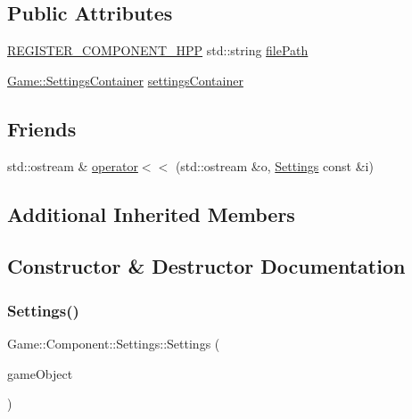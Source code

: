 \subsection*{Public Attributes}
\begin{DoxyCompactItemize}
\item 
\mbox{\hyperlink{_core_8hpp_a895cfc16b36b6c309f80b98ded63df4f}{R\+E\+G\+I\+S\+T\+E\+R\+\_\+\+C\+O\+M\+P\+O\+N\+E\+N\+T\+\_\+\+H\+PP}} std\+::string \mbox{\hyperlink{class_game_1_1_component_1_1_settings_ac8443df701a872a580cfad5e6a6d9fcc}{file\+Path}}
\item 
\mbox{\hyperlink{class_game_1_1_settings_container}{Game\+::\+Settings\+Container}} \mbox{\hyperlink{class_game_1_1_component_1_1_settings_a89bf0344b96da55d2cac38cda9b2faaa}{settings\+Container}}
\end{DoxyCompactItemize}
\subsection*{Friends}
\begin{DoxyCompactItemize}
\item 
std\+::ostream \& \mbox{\hyperlink{class_game_1_1_component_1_1_settings_a2fac0e654b3e111d2eaa4472da05740d}{operator$<$$<$}} (std\+::ostream \&o, \mbox{\hyperlink{class_game_1_1_component_1_1_settings}{Settings}} const \&i)
\end{DoxyCompactItemize}
\subsection*{Additional Inherited Members}


\subsection{Constructor \& Destructor Documentation}
\mbox{\label{class_game_1_1_component_1_1_settings_a2a0d16fdd698140da965cd3367601a49}} 
\subsubsection{\texorpdfstring{Settings()}{Settings()}}
{\footnotesize\ttfamily Game\+::\+Component\+::\+Settings\+::\+Settings (\begin{DoxyParamCaption}\item[{\mbox{\hyperlink{class_beer_engine_1_1_game_object}{Beer\+Engine\+::\+Game\+Object}} $\ast$}]{game\+Object }\end{DoxyParamCaption})}

